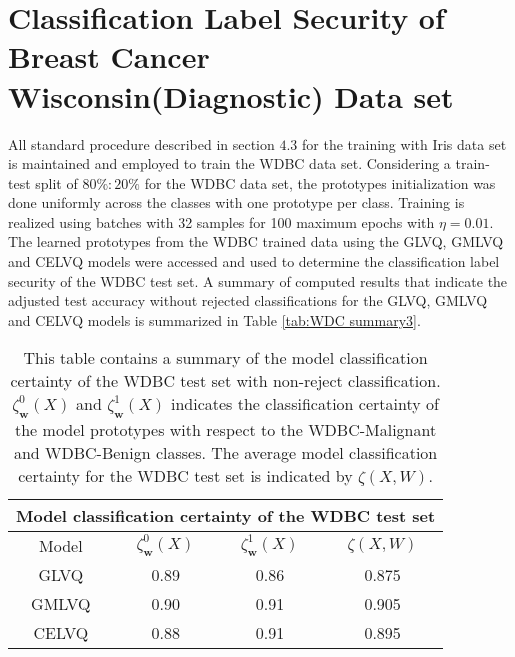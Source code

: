 \documentclass[english]{HSMW-Thesis}
\begin{document}
\section{Classification Label Security of Breast Cancer Wisconsin(Diagnostic) Data set}
All standard procedure described in section $4.3$ for the training with Iris data set is maintained and employed to train the WDBC data set. Considering a train-test split of\hspace{2pt} $80\% : 20\%$\hspace{2pt} for the WDBC data set, the prototypes initialization was done uniformly across the classes with one prototype per class. Training is realized using batches with 32 samples for 100 maximum epochs with $\eta =0.01$. The learned prototypes from the WDBC trained data using the GLVQ, GMLVQ and CELVQ models were accessed and used to determine the classification label security of the WDBC test set. A summary of computed results that indicate the adjusted test accuracy without rejected classifications for the GLVQ, GMLVQ and CELVQ models is summarized in Table \ref{tab:WDC summary3}.
\begin{table}[H]
	\centering
	\begin{tabular}{ |c|c|c|c|  }
		\hline
		\multicolumn{4}{|c|}{Model classification certainty of the WDBC test set} \\
		\hline
		Model &$\zeta_{\mathbf{w}}^{0}(X) $ & $\zeta_{\mathbf{w}}^{1}(X)$ & $\zeta(X,W)$ \\
		\hline
		GLVQ  &0.89  & 0.86   & 0.875  \\
		GMLVQ &0.90  & 0.91    & 0.905  \\
		CELVQ &0.88  & 0.91   & 0.895   \\	
		\hline
	\end{tabular}
	\caption[Summary of model classification certainty of the WDBC test set]{\label{tab:WDBC certainty}This table contains a summary of the model classification certainty of the WDBC test set with non-reject classification.\hspace{2pt} $\zeta_{\mathbf{w}}^{0}(X) $\hspace{2pt} and\hspace{2pt} $\zeta_{\mathbf{w}}^{1}(X)$ \hspace{2pt} indicates the classification certainty of the model prototypes with respect to the WDBC-Malignant and WDBC-Benign classes. The average model classification certainty for the WDBC test set is indicated by\hspace{2pt} $\zeta(X,W)$.}
\end{table}
\end{document}
